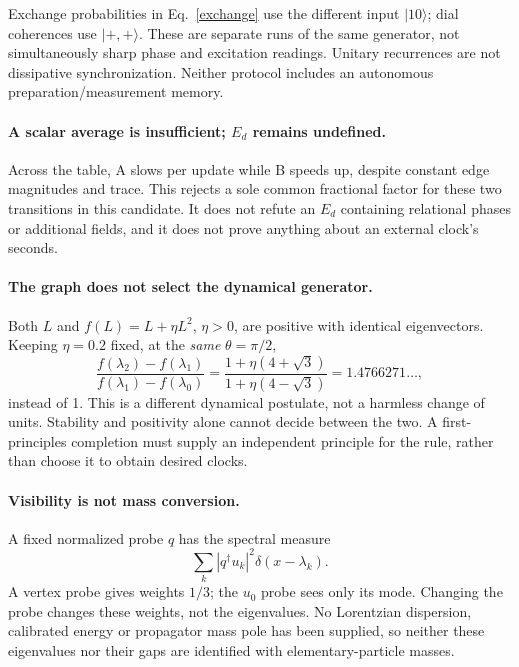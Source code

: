 \documentclass[11pt,a4paper]{article}
\newcommand{\ket}[1]{|#1\rangle}
\begin{document}
Exchange probabilities in Eq.~\eqref{exchange} use the different input
$\ket{10}$; dial coherences use $\ket{+,+}$. These are separate runs of
the same generator, not simultaneously sharp phase and excitation
readings. Unitary recurrences are not dissipative synchronization.
Neither protocol includes an autonomous preparation/measurement memory.

\paragraph{A scalar average is insufficient; $E_d$ remains undefined.}
Across the table, A slows per update while B speeds up, despite constant
edge magnitudes and trace. This rejects a sole common fractional factor
for these two transitions in this candidate. It does not refute an
$E_d$ containing relational phases or additional fields, and it does
not prove anything about an external clock's seconds.

\paragraph{The graph does not select the dynamical generator.}
Both $L$ and $f(L)=L+\eta L^2$, $\eta>0$, are positive with identical
eigenvectors. Keeping $\eta=0.2$ fixed, at the \emph{same} $\theta=\pi/2$,
\begin{equation}
 \frac{f(\lambda_2)-f(\lambda_1)}{f(\lambda_1)-f(\lambda_0)}
 =\frac{1+\eta(4+\sqrt3)}{1+\eta(4-\sqrt3)}=1.4766271\ldots,
\end{equation}
instead of 1. This is a different dynamical postulate, not a harmless
change of units. Stability and positivity alone cannot decide between
the two. A first-principles completion must supply an independent
principle for the rule, rather than choose it to obtain desired clocks.

\paragraph{Visibility is not mass conversion.}
A fixed normalized probe $q$ has the spectral measure
\[
 \sum_k|q^\dagger u_k|^2\delta(x-\lambda_k).
\]
A vertex probe gives weights $1/3$; the $u_0$ probe sees only its mode.
Changing the probe changes these weights, not the eigenvalues.
No Lorentzian dispersion, calibrated energy or propagator mass pole
has been supplied, so neither these eigenvalues nor their gaps are
identified with elementary-particle masses.

\newpage
\end{document}
